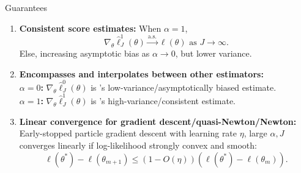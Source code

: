 \documentclass[final]{beamer}
\newlength{\colwidth}
\begin{document}
\begin{frame}[t]
\begin{columns}[t]
\begin{column}{\colwidth}
\begin{alertblock}{Guarantees}
\begin{enumerate}
  $$\frac{\sum_{j=1}^J h\left(x_{n, j}^{F, \theta}\right) w_{n, j}^{F, \theta}}{\sum_{j=1}^J w_{n, j}^{F, \theta}} \stackrel{\text{a.s.}}{\to} \E_{\pi_n(\theta)}[h(X_n)], \qquad \hat{\mathcal{L}}_J^\alpha(\theta) \stackrel{\text{a.s.}}{\to} \mathcal{L}(\theta).$$
  \vspace{1.5ex}
  
  \item \textbf{Consistent score estimates:} When $\alpha=1$, $$\nabla_\theta \hat\ell_J^1(\theta) \stackrel{\text{a.s.}}{\to} \ell(\theta) \text{ as } J \to \infty.$$ Else, increasing asymptotic bias as $\alpha \to 0$, but lower variance.
  \vspace{2ex}
  \item \textbf{Encompasses and interpolates between other estimators:}\\
  \textbf{$\alpha=0$:} $\nabla_\theta \hat\ell_J^0(\theta)$ is \cite{naesseth18}'s low-variance/asymptotically biased estimate. \\
  \textbf{$\alpha=1$:} $\nabla_\theta \hat\ell_J^1(\theta)$ is \cite{poyiadjis11}'s high-variance/consistent estimate.
  \vspace{2ex}
  \item \textbf{Linear convergence for gradient descent/quasi-Newton/Newton:} \\Early-stopped particle gradient descent with learning rate $\eta$, large $\alpha, J$ converges linearly if log-likelihood strongly convex and smooth:
  $$\ell\left(\theta^*\right)-\ell\left(\theta_{m+1}\right) \leq\left(1- O(\eta)\right)\left(\ell\left(\theta^*\right)-\ell\left(\theta_m\right)\right).$$
    \end{enumerate}
  \end{alertblock}


\end{column}
\end{columns}
\end{frame}
\end{document}

